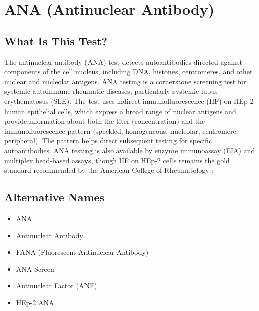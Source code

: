 \chapter{ANA (Antinuclear Antibody)}

\section*{What Is This Test?}
The antinuclear antibody (ANA) test detects autoantibodies directed against components of the cell nucleus, including DNA, histones, centromeres, and other nuclear and nucleolar antigens. ANA testing is a cornerstone screening test for systemic autoimmune rheumatic diseases, particularly systemic lupus erythematosus (SLE). The test uses indirect immunofluorescence (IIF) on HEp-2 human epithelial cells, which express a broad range of nuclear antigens and provide information about both the titer (concentration) and the immunofluorescence pattern (speckled, homogeneous, nucleolar, centromere, peripheral). The pattern helps direct subsequent testing for specific autoantibodies. ANA testing is also available by enzyme immunoassay (EIA) and multiplex bead-based assays, though IIF on HEp-2 cells remains the gold standard recommended by the American College of Rheumatology \cite{agmonlevin2014international}.

\section*{Alternative Names}
\begin{itemize}
  \item ANA
  \item Antinuclear Antibody
  \item FANA (Fluorescent Antinuclear Antibody)
  \item ANA Screen
  \item Antinuclear Factor (ANF)
  \item HEp-2 ANA
\end{itemize}
